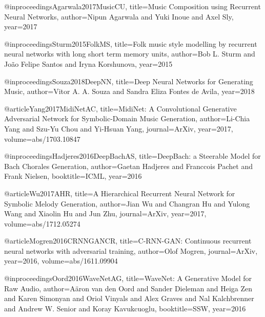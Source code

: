 
@inproceedings{Agarwala2017MusicCU,
  title={Music Composition using Recurrent Neural Networks},
  author={Nipun Agarwala and Yuki Inoue and Axel Sly},
  year={2017}
}

@inproceedings{Sturm2015FolkMS,
  title={Folk music style modelling by recurrent neural networks with long short term memory units},
  author={Bob L. Sturm and Jo{\~a}o Felipe Santos and Iryna Korshunova},
  year={2015}
}

@inproceedings{Souza2018DeepNN,
  title={Deep Neural Networks for Generating Music},
  author={Vitor A. A. Souza and Sandra Eliza Fontes de Avila},
  year={2018}
}

@article{Yang2017MidiNetAC,
  title={MidiNet: A Convolutional Generative Adversarial Network for Symbolic-Domain Music Generation},
  author={Li-Chia Yang and Szu-Yu Chou and Yi-Hsuan Yang},
  journal={ArXiv},
  year={2017},
  volume={abs/1703.10847}
}

@inproceedings{Hadjeres2016DeepBachAS,
  title={DeepBach: a Steerable Model for Bach Chorales Generation},
  author={Gaetan Hadjeres and Franccois Pachet and Frank Nielsen},
  booktitle={ICML},
  year={2016}
}

@article{Wu2017AHR,
  title={A Hierarchical Recurrent Neural Network for Symbolic Melody Generation},
  author={Jian Wu and Changran Hu and Yulong Wang and Xiaolin Hu and Jun Zhu},
  journal={ArXiv},
  year={2017},
  volume={abs/1712.05274}
}

@article{Mogren2016CRNNGANCR,
  title={C-RNN-GAN: Continuous recurrent neural networks with adversarial training},
  author={Olof Mogren},
  journal={ArXiv},
  year={2016},
  volume={abs/1611.09904}
}

@inproceedings{Oord2016WaveNetAG,
  title={WaveNet: A Generative Model for Raw Audio},
  author={A{\"a}ron van den Oord and Sander Dieleman and Heiga Zen and Karen Simonyan and Oriol Vinyals and Alex Graves and Nal Kalchbrenner and Andrew W. Senior and Koray Kavukcuoglu},
  booktitle={SSW},
  year={2016}
}

